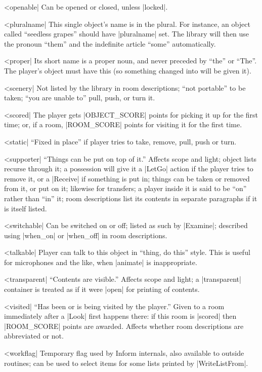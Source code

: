 ^^|openable|
Can be opened or closed, unless |locked|.

^^|pluralname|
This single object's name is in the plural.  For instance, an
object called ``seedless grapes'' should have |pluralname| set.
The library will then use the pronoun ``them'' and the indefinite
article ``some'' automatically.

^^|proper|
Its short name is a proper noun, and never preceded
by ``the'' or ``The''.  The player's object must have this (so something
changed into will be given it).

^^|scenery|
Not listed by the library in room descriptions; ``not portable'' to be
taken; ``you are unable to'' pull, push, or turn it.

^^|scored|
The player gets |OBJECT_SCORE| points for picking
it up for the first time; or, if a room, |ROOM_SCORE| points for visiting
it for the first time.

^^|static|
``Fixed in place'' if player tries to take, remove,
pull, push or turn.

^^|supporter|
``Things can be put on top of it.''  Affects scope and light;
object lists recurse through it; a possession will give it a
|LetGo| action if the player tries to remove it, or a |Receive|
if something is put in; things can be taken or removed from it,
or put on it; likewise for transfers; a player inside it is said
to be ``on'' rather than ``in'' it; room descriptions list
its contents in separate paragraphs if it is itself listed.

^^|switchable|
Can be switched on or off; listed
as such by |Examine|; described using |when_on| or |when_off|
in room descriptions.

^^|talkable|
Player can talk to this object in
``thing, do this'' style.  This is useful for microphones and
the like, when |animate| is inappropriate.

^^|transparent|
``Contents are visible.''  Affects scope and light;
a |transparent| container is treated as if it were |open| for
printing of contents.

^^|visited|
``Has been or is being visited by the player.''
Given to a room immediately after a |Look| first
happens there: if this room is |scored| then |ROOM_SCORE| points
are awarded.  Affects whether room descriptions are abbreviated
or not.

^^|workflag|
Temporary flag used by Inform internals,
also available to outside routines; can be used to select items
for some lists printed by |WriteListFrom|.

